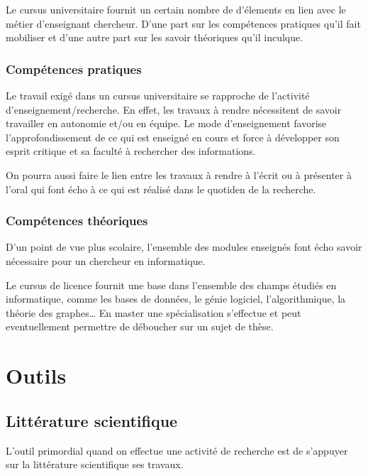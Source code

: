 \documentclass[14pt, a4paper]{report}
\begin{document}
	Le cursus universitaire fournit un certain nombre de d'élements en lien avec le métier d'enseignant chercheur. D'une part sur les compétences pratiques qu'il fait mobiliser et d'une autre part sur les savoir théoriques qu'il inculque.

    \subsection{Compétences pratiques}


    Le travail exigé dans un cursus universitaire se rapproche de l'activité d'enseignement/recherche. En effet, les travaux à rendre nécessitent de savoir travailler en autonomie et/ou en équipe.
    Le mode d'enseignement favorise l'approfondissement de ce qui est enseigné en cours et force à développer son esprit critique et sa faculté à rechercher des informations.

    On pourra aussi faire le lien entre les travaux à rendre à l'écrit ou à présenter à l'oral qui font écho à ce qui est réalisé dans le quotiden de la recherche.

    \subsection{Compétences théoriques}

    D'un point de vue plus scolaire, l'ensemble des modules enseignés font écho savoir nécessaire pour un chercheur en informatique.

    Le cursus de licence fournit une base dans l'ensemble des champs étudiés en informatique, comme les bases de données, le génie logiciel, l'algorithmique, la théorie des graphes\dots
    En master une spécialisation s'effectue et peut eventuellement permettre de déboucher sur un sujet de thèse.

\chapter{Outils}

  \section{Littérature scientifique}

  L'outil primordial quand on effectue une activité de recherche est de s'appuyer sur la littérature scientifique ses travaux.
\end{document}
